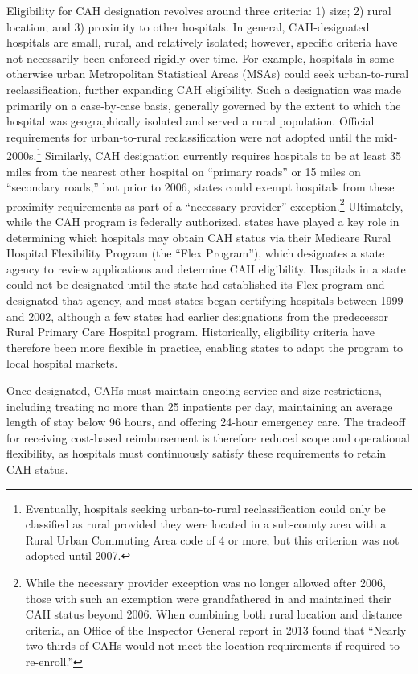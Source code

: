 \documentclass[a4paper, 12pt, twoside]{article}
\begin{document}
Eligibility for CAH designation revolves around three criteria: 1) size; 2) rural location; and 3) proximity to other hospitals. In general, CAH-designated hospitals are small, rural, and relatively isolated; however, specific criteria have not necessarily been enforced rigidly over time. For example, hospitals in some otherwise urban Metropolitan Statistical Areas (MSAs) could seek urban-to-rural reclassification, further expanding CAH eligibility. Such a designation was made primarily on a case-by-case basis, generally governed by the extent to which the hospital was geographically isolated and served a rural population. Official requirements for urban-to-rural reclassification were not adopted until the mid-2000s.\footnote{Eventually, hospitals seeking urban-to-rural reclassification could only be classified as rural provided they were located in a sub-county area with a Rural Urban Commuting Area code of 4 or more, but this criterion was not adopted until 2007.} Similarly, CAH designation currently requires hospitals to be at least 35 miles from the nearest other hospital on ``primary roads'' or 15 miles on ``secondary roads,'' but prior to 2006, states could exempt hospitals from these proximity requirements as part of a ``necessary provider'' exception.\footnote{While the necessary provider exception was no longer allowed after 2006, those with such an exemption were grandfathered in and maintained their CAH status beyond 2006. When combining both rural location and distance criteria, an Office of the Inspector General report in 2013 found that ``Nearly two-thirds of CAHs would not meet the location requirements if required to re-enroll.''} Ultimately, while the CAH program is federally authorized, states have played a key role in determining which hospitals may obtain CAH status via their Medicare Rural Hospital Flexibility Program (the ``Flex Program''), which designates a state agency to review applications and determine CAH eligibility. Hospitals in a state could not be designated until the state had established its Flex program and designated that agency, and most states began certifying hospitals between 1999 and 2002, although a few states had earlier designations from the predecessor Rural Primary Care Hospital program. Historically, eligibility criteria have therefore been more flexible in practice, enabling states to adapt the program to local hospital markets.

Once designated, CAHs must maintain ongoing service and size restrictions, including treating no more than 25 inpatients per day, maintaining an average length of stay below 96 hours, and offering 24-hour emergency care. The tradeoff for receiving cost-based reimbursement is therefore reduced scope and operational flexibility, as hospitals must continuously satisfy these requirements to retain CAH status.
\end{document}
